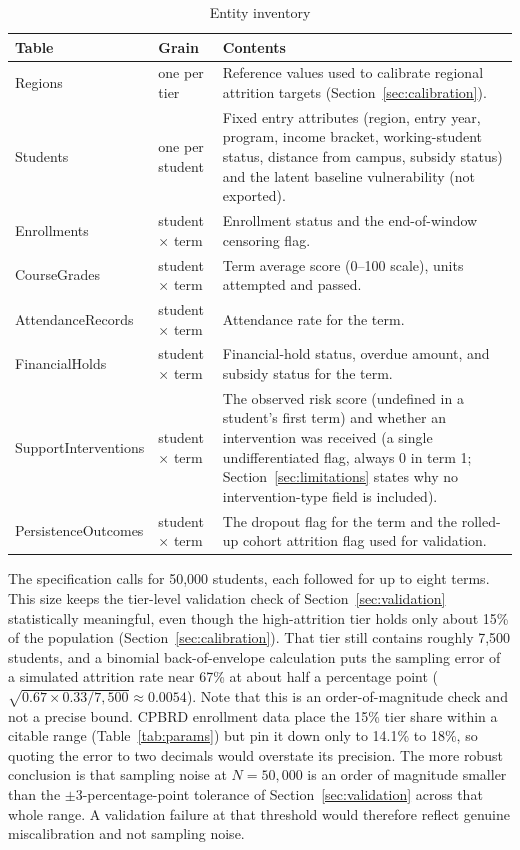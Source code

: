 \documentclass[11pt]{article}
\begin{document}
\begin{table}[htbp]
\caption{Entity inventory}
\label{tab:entities}
\centering
\small
\renewcommand{\arraystretch}{1.2}
\begin{tabular}{@{}p{}p{}p{}@{}}
\toprule
\textbf{Table} & \textbf{Grain} & \textbf{Contents} \\
\midrule
Regions & one per tier & Reference values used to calibrate regional attrition targets (Section~\ref{sec:calibration}). \\
\addlinespace
Students & one per student & Fixed entry attributes (region, entry year, program, income bracket, working-student status, distance from campus, subsidy status) and the latent baseline vulnerability (not exported). \\
\addlinespace
Enrollments & student $\times$ term & Enrollment status and the end-of-window censoring flag. \\
\addlinespace
CourseGrades & student $\times$ term & Term average score (0--100 scale), units attempted and passed. \\
\addlinespace
AttendanceRecords & student $\times$ term & Attendance rate for the term. \\
\addlinespace
FinancialHolds & student $\times$ term & Financial-hold status, overdue amount, and subsidy status for the term. \\
\addlinespace
SupportInterventions & student $\times$ term & The observed risk score (undefined in a student's first term) and whether an intervention was received (a single undifferentiated flag, always 0 in term 1; Section~\ref{sec:limitations} states why no intervention-type field is included). \\
\addlinespace
PersistenceOutcomes & student $\times$ term & The dropout flag for the term and the rolled-up cohort attrition flag used for validation. \\
\bottomrule
\end{tabular}
\end{table}

The specification calls for 50,000 students, each followed for up to eight terms. This size keeps the tier-level validation check of Section~\ref{sec:validation} statistically meaningful, even though the high-attrition tier holds only about 15\% of the population (Section~\ref{sec:calibration}). That tier still contains roughly 7,500 students, and a binomial back-of-envelope calculation puts the sampling error of a simulated attrition rate near 67\% at about half a percentage point ($\sqrt{0.67 \times 0.33 / 7{,}500} \approx 0.0054$). Note that this is an order-of-magnitude check and not a precise bound. CPBRD enrollment data place the 15\% tier share within a citable range (Table~\ref{tab:params}) but pin it down only to 14.1\% to 18\%, so quoting the error to two decimals would overstate its precision. The more robust conclusion is that sampling noise at $N=50{,}000$ is an order of magnitude smaller than the $\pm$3-percentage-point tolerance of Section~\ref{sec:validation} across that whole range. A validation failure at that threshold would therefore reflect genuine miscalibration and not sampling noise.
\end{document}
